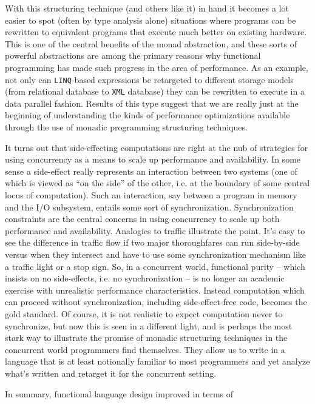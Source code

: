 With this structuring technique (and others like it) in hand it
becomes a lot easier to spot (often by type analysis alone) situations
where programs can be rewritten to equivalent programs that execute
much better on existing hardware. This is one of the central benefits
of the monad abstraction, and these sorts of powerful abstractions are
among the primary reasons why functional programming has made such
progress in the area of performance. As an example, not only can
\texttt{LINQ}-based expressions be retargeted to different
storage models (from relational database to \texttt{XML} database)
they can be rewritten to execute in a data parallel fashion. Results
of this type suggest that we are really just at the beginning of
understanding the kinds of performance optimizations available through
the use of monadic programming structuring techniques.

It turns out that side-effecting computations are right at the nub of
strategies for using concurrency as a means to scale up performance
and availability. In some sense a side-effect really represents an
interaction between two systems (one of which is viewed as ``on the
side'' of the other, i.e. at the boundary of some central locus of
computation). Such an interaction, say between a program in memory and
the I/O subsystem, entails some sort of
synchronization. Synchronization constraints are the central concerns
in using concurrency to scale up both performance and
availability. Analogies to traffic illustrate the point. It's easy to
see the difference in traffic flow if two major thoroughfares can run
side-by-side versus when they intersect and have to use some
synchronization mechanism like a traffic light or a stop sign. So, in
a concurrent world, functional purity -- which insists on no
side-effects, i.e. no synchronization -- is no longer an academic
exercise with unrealistic performance characteristics. Instead
computation which can proceed without synchronization, including
side-effect-free code, becomes the gold standard. Of course, it is not
realistic to expect computation never to synchronize, but now this is
seen in a different light, and is perhaps the most stark way to
illustrate the promise of monadic structuring techniques in the
concurrent world programmers find themselves. They allow us to write
in a language that is at least notionally familiar to most programmers
and yet analyze what's written and retarget it for the concurrent
setting.

In summary, functional language design improved in terms of 


